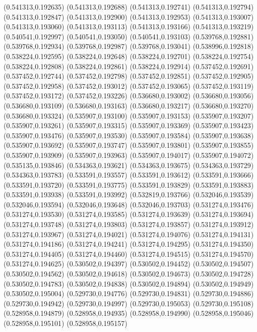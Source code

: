 (0.541313,0.192635)
(0.541313,0.192688)
(0.541313,0.192741)
(0.541313,0.192794)
(0.541313,0.192847)
(0.541313,0.192900)
(0.541313,0.192953)
(0.541313,0.193007)
(0.541313,0.193060)
(0.541313,0.193113)
(0.541313,0.193166)
(0.541313,0.193219)
(0.540541,0.192997)
(0.540541,0.193050)
(0.540541,0.193103)
(0.539768,0.192881)
(0.539768,0.192934)
(0.539768,0.192987)
(0.539768,0.193041)
(0.538996,0.192818)
(0.538224,0.192595)
(0.538224,0.192648)
(0.538224,0.192701)
(0.538224,0.192754)
(0.538224,0.192808)
(0.538224,0.192861)
(0.538224,0.192914)
(0.537452,0.192691)
(0.537452,0.192744)
(0.537452,0.192798)
(0.537452,0.192851)
(0.537452,0.192905)
(0.537452,0.192958)
(0.537452,0.193012)
(0.537452,0.193065)
(0.537452,0.193119)
(0.537452,0.193172)
(0.537452,0.193226)
(0.536680,0.193002)
(0.536680,0.193056)
(0.536680,0.193109)
(0.536680,0.193163)
(0.536680,0.193217)
(0.536680,0.193270)
(0.536680,0.193324)
(0.535907,0.193100)
(0.535907,0.193153)
(0.535907,0.193207)
(0.535907,0.193261)
(0.535907,0.193315)
(0.535907,0.193369)
(0.535907,0.193423)
(0.535907,0.193476)
(0.535907,0.193530)
(0.535907,0.193584)
(0.535907,0.193638)
(0.535907,0.193692)
(0.535907,0.193747)
(0.535907,0.193801)
(0.535907,0.193855)
(0.535907,0.193909)
(0.535907,0.193963)
(0.535907,0.194017)
(0.535907,0.194072)
(0.535135,0.193846)
(0.534363,0.193621)
(0.534363,0.193675)
(0.534363,0.193729)
(0.534363,0.193783)
(0.533591,0.193557)
(0.533591,0.193612)
(0.533591,0.193666)
(0.533591,0.193720)
(0.533591,0.193775)
(0.533591,0.193829)
(0.533591,0.193883)
(0.533591,0.193938)
(0.533591,0.193992)
(0.532819,0.193766)
(0.532046,0.193539)
(0.532046,0.193594)
(0.532046,0.193648)
(0.532046,0.193703)
(0.531274,0.193476)
(0.531274,0.193530)
(0.531274,0.193585)
(0.531274,0.193639)
(0.531274,0.193694)
(0.531274,0.193748)
(0.531274,0.193803)
(0.531274,0.193857)
(0.531274,0.193912)
(0.531274,0.193967)
(0.531274,0.194021)
(0.531274,0.194076)
(0.531274,0.194131)
(0.531274,0.194186)
(0.531274,0.194241)
(0.531274,0.194295)
(0.531274,0.194350)
(0.531274,0.194405)
(0.531274,0.194460)
(0.531274,0.194515)
(0.531274,0.194570)
(0.531274,0.194625)
(0.530502,0.194397)
(0.530502,0.194452)
(0.530502,0.194507)
(0.530502,0.194562)
(0.530502,0.194618)
(0.530502,0.194673)
(0.530502,0.194728)
(0.530502,0.194783)
(0.530502,0.194838)
(0.530502,0.194894)
(0.530502,0.194949)
(0.530502,0.195004)
(0.529730,0.194776)
(0.529730,0.194831)
(0.529730,0.194886)
(0.529730,0.194942)
(0.529730,0.194997)
(0.529730,0.195053)
(0.529730,0.195108)
(0.528958,0.194879)
(0.528958,0.194935)
(0.528958,0.194990)
(0.528958,0.195046)
(0.528958,0.195101)
(0.528958,0.195157)
